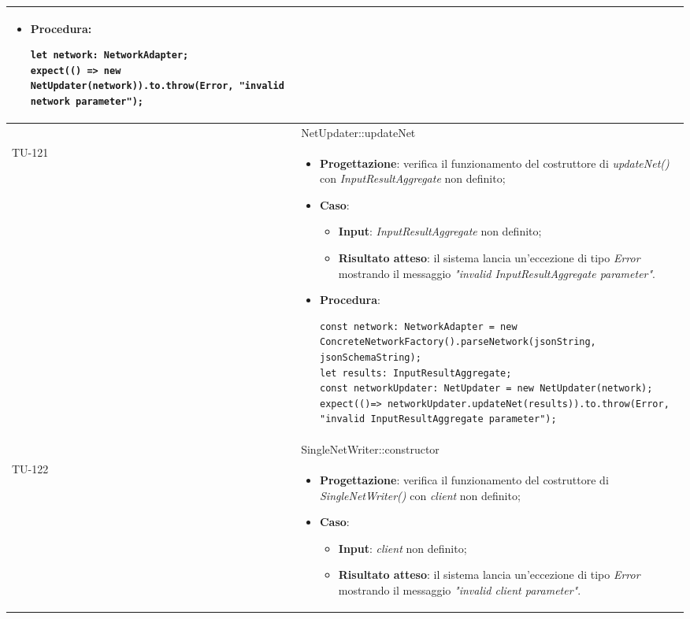 \begin{longtable}{|C{1.5cm}|C{14.5cm}|}
\begin{itemize}
\begin{itemize}
	\end{itemize}
	\item \textbf{Procedura}:
	\begin{lstlisting}
let network: NetworkAdapter;
expect(() => new NetUpdater(network)).to.throw(Error, "invalid network parameter");
	\end{lstlisting}
\end{itemize}\\
\hline
{} & NetUpdater::updateNet
\\ \hline
{TU-121} &
\begin{itemize}
	\item \textbf{Progettazione}: verifica il funzionamento del costruttore di \emph{updateNet()} con \emph{InputResultAggregate} non definito;
	\item \textbf{Caso}: 
	\begin{itemize}
		\item \textbf{Input}: \emph{InputResultAggregate} non definito;
		\item \textbf{Risultato atteso}: il sistema lancia un'eccezione di tipo \emph{Error} mostrando il messaggio \emph{"invalid InputResultAggregate parameter"}.
	\end{itemize}
	\item \textbf{Procedura}:
	\begin{lstlisting}
const network: NetworkAdapter = new ConcreteNetworkFactory().parseNetwork(jsonString, jsonSchemaString);
let results: InputResultAggregate;
const networkUpdater: NetUpdater = new NetUpdater(network);
expect(()=> networkUpdater.updateNet(results)).to.throw(Error, "invalid InputResultAggregate parameter");
	\end{lstlisting}
\end{itemize}\\
\hline
{} & SingleNetWriter::constructor
\\ \hline
{TU-122} &
\begin{itemize}
	\item \textbf{Progettazione}: verifica il funzionamento del costruttore di \emph{SingleNetWriter()} con \emph{client} non definito;
	\item \textbf{Caso}: 
	\begin{itemize}
		\item \textbf{Input}: \emph{client} non definito;
		\item \textbf{Risultato atteso}: il sistema lancia un'eccezione di tipo \emph{Error} mostrando il messaggio \emph{"invalid client parameter"}.

\end{itemize}
\end{itemize}
\end{longtable}
